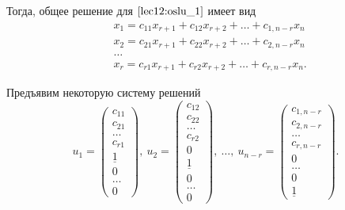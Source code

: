\documentclass[a4paper]{article}
\begin{document}
\begin{colloq}
            Тогда, общее решение для $\eqref{lec12:oslu_1}$ имеет вид
            \begin{align*}
                &x_1 = c_{11} x_{r + 1} + c_{12}x_{r + 2} + \dots + c_{1, n - r} x_n \\
                &x_2 = c_{21} x_{r + 1} + c_{22}x_{r + 2} + \dots + c_{2, n - r} x_n \\
                &\dots \\
                &x_r = c_{r1} x_{r + 1} + c_{r2}x_{r + 2} + \dots + c_{r, n - r} x_n
            .\end{align*}

            Предъявим некоторую систему решений
            \begin{equation*}
                u_1 = \begin{pmatrix} 
                    c_{11} \\
                    c_{21} \\
                    \dots \\
                    c_{r1} \\
                    \underline{1} \\
                    0 \\
                    \dots \\
                    0
                \end{pmatrix}, \
                u_2 = \begin{pmatrix} 
                    c_{12} \\
                    c_{22} \\
                    \dots \\
                    c_{r2} \\
                    0 \\
                    \underline{1} \\
                    0 \\
                    \dots \\
                    0
                \end{pmatrix}, \ \dots, \
                u_{n - r} = \begin{pmatrix} 
                    c_{1, n - r} \\
                    c_{2, n - r} \\
                    \dots \\
                    c_{r, n - r} \\
                    0 \\
                    \dots \\
                    0 \\
                    \underline{1}
                \end{pmatrix}
            .\end{equation*}


\end{colloq}
\end{document}
